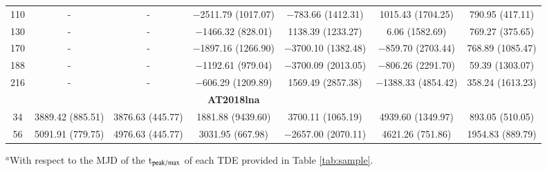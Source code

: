 \documentclass[structabstract]{aa}
\begin{document}
\begin{small}
\begin{longtable}{c c c c c c c}
110	&	-	&	-	&	$-$2511.79 (1017.07)	&	$-$783.66 (1412.31)	&	1015.43 (1704.25)	&	790.95 (417.11)  \\
130	&	-	&	-	&	$-$1466.32 (828.01)	&	1138.39 (1233.27)	&	6.06 (1582.69)	&	769.27 (375.65)  \\
170	&	-	&	-	&	$-$1897.16 (1266.90)	&	$-$3700.10 (1382.48)	&	$-$859.70 (2703.44)	&	768.89 (1085.47)  \\
188	&	-	&	-	&	$-$1192.61 (979.04)	&	$-$3700.09 (2013.05)	&	$-$806.26 (2291.70)	&	59.39 (1303.07)  \\
216	&	-	&	-	&	$-$606.29 (1209.89)	&	1569.49 (2857.38)	&	$-$1388.33 (4854.42)	&	358.24 (1613.23)  \\ \hline
	&		&		&	\textbf{AT2018lna}	&		&		&	\\ \hline
34	&	3889.42 (885.51)	&	3876.63 (445.77)	&	1881.88 (9439.60)	&	3700.11 (1065.19)	&	4939.60 (1349.97)	&	893.05 (510.05)  \\
56	&	5091.91 (779.75)	&	4976.63 (445.77)	&	3031.95 (667.98)	&	$-$2657.00 (2070.11)	&	4621.26 (751.86)	&	1954.83 (889.79)  \\
\end{longtable}
$^{a}$With respect to the MJD of the t$_{\rm peak/max}$ of each TDE provided in Table \ref{tab:sample}. %
\end{small}




    
\end{document}
